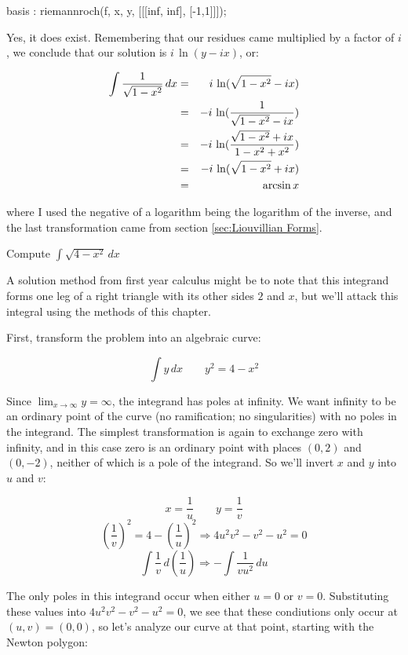 \begin{maximablock}
basis : riemannroch(f, x, y, [[[inf, inf], [-1,1]]]);
\end{maximablock}

Yes, it does exist.
Remembering that our residues came multiplied by a factor of $i$, we
conclude that our solution is $i\,\ln(y-ix)$, or:

\begin{eqnarray*}
\int {1\over{\sqrt{1-x^2}}} \,dx &=& i\,\ln(\sqrt{1-x^2}-ix) \\
                                 &=& -i\,\ln({1\over{\sqrt{1-x^2}-ix}}) \\
                                 &=& -i\,\ln({{\sqrt{1-x^2}+ix}\over{1-x^2+x^2}}) \\
                                 &=& -i\,\ln({\sqrt{1-x^2}+ix}) \\
                                 &=& \arcsin x \\
\end{eqnarray*}

where I used the negative of a logarithm being the logarithm of the
inverse, and the last transformation came from section
\ref{sec:Liouvillian Forms}.


\endexample

\example Compute $\int \sqrt{4-x^2} \,dx$

A solution method from first year calculus might be to note that this
integrand forms one leg of a right triangle with its other sides $2$
and $x$, but we'll attack this integral using the methods of this
chapter.

First, transform the problem into an algebraic curve:

$$\int y\,dx \qquad y^2 = 4-x^2$$

Since $\lim_{x\to\infty} y = \infty$, the integrand has poles at
infinity.  We want infinity to be an ordinary point of the curve (no
ramification; no singularities) with no poles in the integrand.  The
simplest transformation is again to exchange zero with infinity, and in this
case zero is an ordinary point with places $(0,2)$ and $(0,-2)$,
neither of which is a pole of the integrand.  So we'll invert
$x$ and $y$ into $u$ and $v$:

$$x=\frac{1}{u} \qquad y=\frac{1}{v}$$
$$\left(\frac{1}{v}\right)^2 = 4 - \left(\frac{1}{u}\right)^2 \Longrightarrow 4u^2v^2 - v^2 - u^2=0$$
$$\int\frac{1}{v} \, d\left(\frac{1}{u}\right) \Longrightarrow -\int\frac{1}{vu^2}\,du$$

The only poles in this integrand occur when either $u=0$ or $v=0$.
Substituting these values into $4u^2v^2 - v^2 -u^2=0$, we see that
these condiutions only occur at $(u,v)=(0,0)$, so let's analyze our
curve at that point, starting with the Newton polygon:


